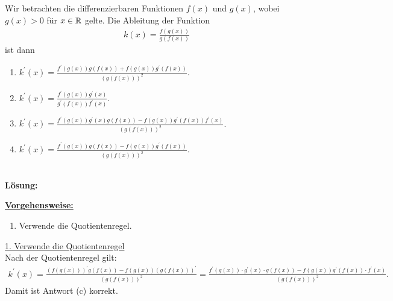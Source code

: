 \newpage
\subsection*{}
Wir betrachten die differenzierbaren Funktionen $ f(x) $ und $ g(x) $, wobei $ g(x) > 0 $ für $ x \in \mathbb{R} $ gelte. Die Ableitung der Funktion
\begin{align*}
	k(x)
	=
	\frac{f(g(x))}{g(f(x))}
\end{align*}
ist dann
\renewcommand{\labelenumi}{(\alph{enumi})}
\begin{enumerate}
	\item 
	$ k^\prime(x) = \frac{f^\prime(g(x))g(f(x)) + f(g(x))g^\prime(f(x))}{(g(f(x)))^2} $.
	\item
	$ k^\prime(x) = \frac{f^\prime(g(x))g^\prime(x) }{g^\prime(f(x))f^\prime(x)} $.
	
	\item
	$ k^\prime(x) = 
	\frac{f^\prime(g(x))g^\prime(x)g(f(x)) - f(g(x)) g^\prime(f(x)) f^\prime(x) }
	{(g(f(x)))^2} $.
	\item
	$ k^\prime(x) = \frac{f^\prime(g(x))g(f(x)) - f(g(x))g^\prime(f(x))}{(g(f(x)))^2} $.
\end{enumerate}
\ \\
\textbf{Lösung:}
\begin{mdframed}
	\underline{\textbf{Vorgehensweise:}}
	\renewcommand{\labelenumi}{\theenumi.}
	\begin{enumerate}
		\item Verwende die Quotientenregel.
	\end{enumerate}
\end{mdframed}

\underline{1. Verwende die Quotientenregel}\\
Nach der Quotientenregel gilt:
\begin{align*}
	k^\prime(x)
	=
	\frac{(f(g(x)))^\prime g(f(x)) - f(g(x)) (g(f(x)))^\prime}{(g(f(x)))^2}
	=
	\frac{f^\prime(g(x)) \cdot g^\prime(x) \cdot g(f(x))
		- 
		f(g(x)) g^\prime(f(x)) \cdot f^\prime(x)
		}{(g(f(x)))^2}.
\end{align*}
Damit ist Antwort (c) korrekt.


\newpage
